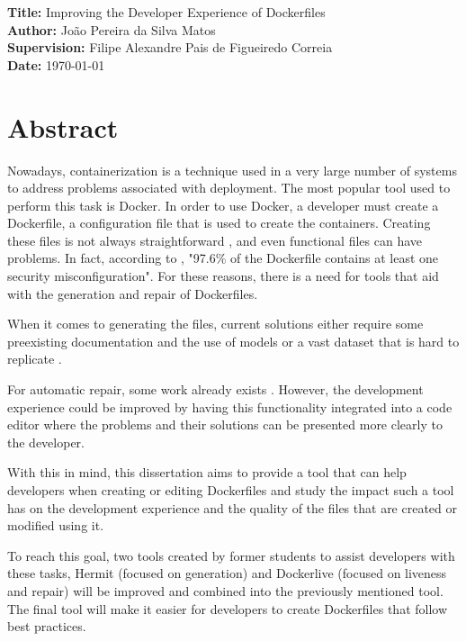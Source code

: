 \documentclass[11pt,a4paper]{article}
\newcommand{\titles}[2]{\noindent\textbf{#1:} #2\\[2mm]}
\begin{document}
\titles{Title}{Improving the Developer Experience of Dockerfiles}
\titles{Author}{João Pereira da Silva Matos}
\titles{Supervision}{Filipe Alexandre Pais de Figueiredo Correia}
\titles{Date}{\today}

\section*{Abstract}

Nowadays, containerization is a technique used in a very large number of systems to address problems associated with deployment. The most popular tool used to perform this task is Docker. In order to use Docker, a developer must create a Dockerfile, a configuration file that is used to create the containers. Creating these files is not always straightforward \cite{reisLiveDockerContainers2020}, and even functional files can have problems. In fact, according to \citeauthor{prinettoSecurityMisconfigurationsDetection} \cite{prinettoSecurityMisconfigurationsDetection}, "97.6\% of the Dockerfile contains at least one security misconfiguration". For these reasons, there is a need for tools that aid with the generation and repair of Dockerfiles.

When it comes to generating the files, current solutions either require some preexisting documentation and the use of models \cite{tomyModusDatalogDialect2022} or a vast dataset that is hard to replicate \cite{yeDockerGenKnowledgeGraph2021a}.

For automatic repair, some work already exists \cite{henkelShipwrightHumanintheLoopSystem2021}. However, the development experience could be improved by having this functionality integrated into a code editor where the problems and their solutions can be presented more clearly to the developer.

With this in mind, this dissertation aims to provide a tool that can help developers when creating or editing Dockerfiles and study the impact such a tool
has on the development experience and the quality of the files that are created or modified using it.

To reach this goal, two tools created by former students to assist developers with these tasks, Hermit \cite{maduroAutomaticServiceContainerization2021} (focused on generation) and Dockerlive \cite{reisLiveDockerContainers2020} (focused on liveness and repair) will be improved and combined into the previously mentioned tool. The final tool will make it easier for developers to create Dockerfiles that follow best practices.
\end{document}
